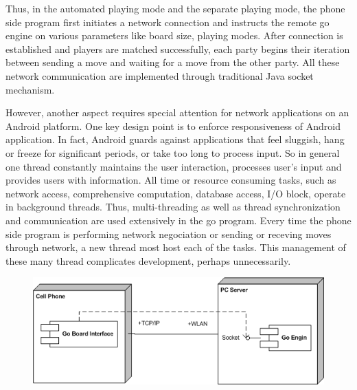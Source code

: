 \documentclass[acmtocl]{acmtrans2m}
\begin{document}
Thus, in the automated playing mode and the separate playing mode, the phone side program first initiates a network connection and instructs the remote go engine on various parameters like board size, playing modes. After connection is established and players are matched successfully, each party begins their iteration between sending a move and waiting for a move from the other party.  All these network communication are implemented through traditional Java socket mechanism.

However, another aspect requires special attention for network applications on an Android platform.  One key design point is to enforce responsiveness of Android application.  In fact, Android guards against applications that feel sluggish, hang or freeze for significant periods, or take too long to process input.  So in general one thread constantly maintains the user interaction, processes user's input and provides users with information.  All time or resource consuming tasks, such as network access, comprehensive computation, database access, I/O block, operate in background threads.  Thus, multi-threading as well as thread synchronization and communication are used extensively in the go program.  Every time the phone side program is performing network negociation or sending or receving moves through network, a new thread most host each of the tasks.  This management of these many thread complicates development, perhaps unnecessarily.  

\begin{figure}[t]
 \centering
 \includegraphics[width = \linewidth]{fig/deployment}
 \label{fig:deploy}
\end{figure}
\end{document}
